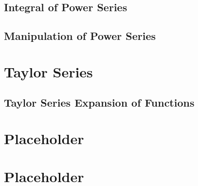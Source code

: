 \documentclass[a4paper]{article}
\begin{document}
  \subsection{Integral of Power Series}
  \subsection{Manipulation of Power Series}
  \section{Taylor Series} 
  \subsection{Taylor Series Expansion of Functions}
  \section{Placeholder} 
  \section{Placeholder} 
\end{document}
